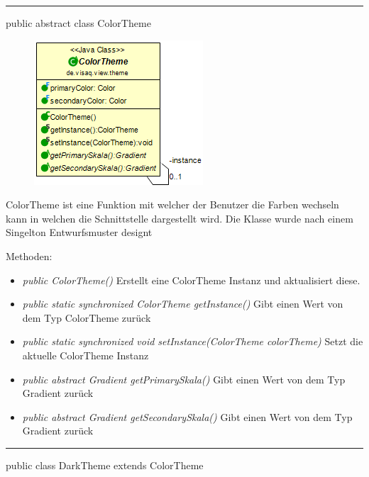 

\rule{\textwidth}{0.4pt} 
public abstract class ColorTheme

\begin{minipage}{0.3\textwidth}
    \begin{figure}[H]
        \includegraphics[scale = 0.5]{media/frontend/view/de.view.elements.theme/ColorTheme_Class.png}
    \end{figure}
    \end{minipage} \hfill
    \begin{minipage}{0.6\textwidth}
ColorTheme ist eine Funktion mit welcher der Benutzer die Farben wechseln kann in welchen die Schnittstelle dargestellt wird. Die Klasse wurde nach einem Singelton Entwurfsmuster designt
\end{minipage}

Methoden:
\begin{itemize} 
    \item \emph{public ColorTheme()} Erstellt eine ColorTheme Instanz und aktualisiert diese.
    \item \emph{public static synchronized ColorTheme getInstance()} Gibt einen Wert von dem Typ ColorTheme zurück
    \item \emph{public static synchronized void setInstance(ColorTheme colorTheme)} Setzt die aktuelle ColorTheme Instanz   
    \item \emph{public abstract Gradient getPrimarySkala()} Gibt einen Wert von dem Typ Gradient zurück
    \item \emph{public abstract Gradient getSecondarySkala()}  Gibt einen Wert von dem Typ Gradient zurück
\end{itemize}

\rule{\textwidth}{0.4pt} 
public class DarkTheme extends ColorTheme

